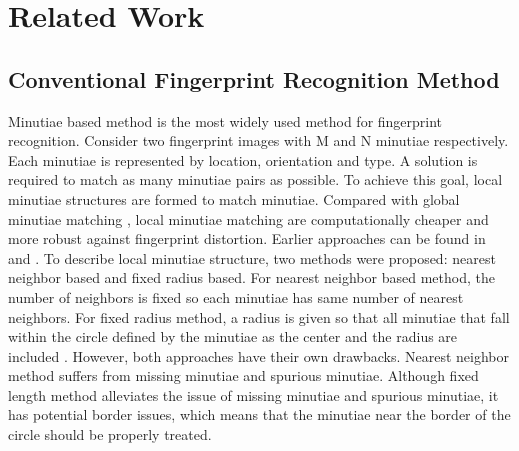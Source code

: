 \section{Related Work}
\label{sec:related}

\subsection{Conventional Fingerprint Recognition Method}
Minutiae based method is the most widely used method for fingerprint recognition. Consider two fingerprint images with M and N minutiae respectively. Each minutiae is represented by location, orientation and type. A solution is required to match as many minutiae pairs as possible. To achieve this goal, local minutiae structures are formed to match minutiae. Compared with global minutiae matching \cite{ChikkerurICB2006}, local minutiae matching are computationally cheaper and more robust against fingerprint distortion. Earlier approaches can be found in \cite{HrechakPR1990} and \cite{KovacsTPAMI2000}. To describe local minutiae structure, two methods were proposed: nearest neighbor based and fixed radius based. For nearest neighbor based method, the number of neighbors is fixed \cite{JiangICPR2000} so each minutiae has same number of nearest neighbors. For fixed radius method, a radius is given so that all minutiae that fall within the circle defined by the minutiae as the center and the radius are included \cite{CappelliTPAMI2010mcc}. However, both approaches have their own drawbacks. Nearest neighbor method suffers from missing minutiae and spurious minutiae. Although fixed length method alleviates the issue of missing minutiae and spurious minutiae, it has potential border issues, which means that the minutiae near the border of the circle should be properly treated.

